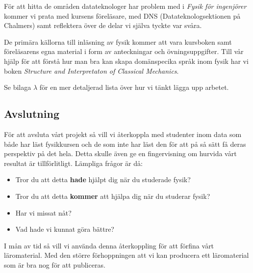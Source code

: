 \documentclass[12pt,a4paper]{article}
\begin{document}
För att hitta de områden datateknologer har problem med i \textit{Fysik för ingenjörer} kommer vi prata med kursens föreläsare, med DNS (Datateknologsektionen på Chalmers) samt reflektera över de delar vi själva tyckte var svåra.

De primära källorna till inläsning av fysik kommer att vara kursboken samt föreläsarens egna material i form av anteckningar och övningsuppgifter. Till vår hjälp för att förstå hur man bra kan skapa domänspecika språk inom fysik har vi boken \textit{Structure and Interpretaton of Classical Mechanics}\cite{SICM}.

Se bilaga $\lambda$ för en mer detaljerad lista över hur vi tänkt lägga upp arbetet.


\subsection{Avslutning}

För att avsluta vårt projekt så vill vi återkoppla med studenter inom data som både har läst fysikkursen och de som inte har läst den för att på så sätt få deras perspektiv på det hela. Detta skulle även ge en fingervisning om hurvida vårt resultat är tillförlitligt. Lämpliga frågor är då:

\begin{itemize}
    \item Tror du att detta \textbf{hade} hjälpt dig när du studerade fysik?
    \item Tror du att detta \textbf{kommer} att hjälpa dig när du studerar fysik?
    \item Har vi missat nåt?
    \item Vad hade vi kunnat göra bättre?
\end{itemize}

I mån av tid så vill vi använda denna återkoppling för att förfina vårt läromaterial. Med den större förhoppningen att vi kan producera ett läromaterial som är bra nog för att publiceras.
\end{document}
